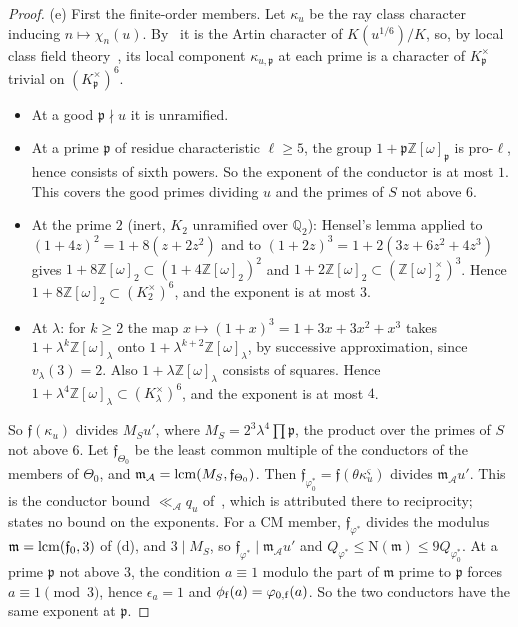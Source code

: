 \documentclass[11pt]{article}
\numberwithin{equation}{section}
\newcommand{\OO}{\mathbb Z[\omega]}
\newcommand{\N}{\mathrm N}
\begin{document}
\begin{proof}
(e) First the finite-order members. Let $\kappa_u$ be the ray class character inducing
$n\mapsto\chi_n(u)$. By~\cite[Lemma~4.1]{OAI78} it is the Artin character of
$K(u^{1/6})/K$, so, by local class field theory~\cite[Ch.~V]{Neukirch}, its local component $\kappa_{u,\mathfrak p}$ at each prime is a character of
$K_{\mathfrak p}^\times$ trivial on $(K_{\mathfrak p}^\times)^6$.
\begin{itemize}
\item At a good $\mathfrak p\nmid u$ it is unramified.
\item At a prime $\mathfrak p$ of residue characteristic $\ell\ge5$, the group
 $1+\mathfrak p\OO_{\mathfrak p}$ is pro-$\ell$, hence consists of sixth powers. So the exponent of the
 conductor is at most $1$. This covers the good primes dividing $u$ and the primes of $S$ not above $6$.
\item At the prime $2$ (inert, $K_2$ unramified over $\mathbb Q_2$): Hensel's lemma applied to
 $(1+4z)^2=1+8(z+2z^2)$ and to $(1+2z)^3=1+2(3z+6z^2+4z^3)$ gives
 $1+8\OO_2\subset(1+4\OO_2)^2$ and $1+2\OO_2\subset(\OO_2^\times)^3$. Hence
 $1+8\OO_2\subset(K_2^\times)^6$, and the exponent is at most $3$.
\item At $\lambda$: for $k\ge2$ the map $x\mapsto(1+x)^3=1+3x+3x^2+x^3$ takes $1+\lambda^k\OO_\lambda$
 onto $1+\lambda^{k+2}\OO_\lambda$, by successive approximation, since $v_\lambda(3)=2$. Also
 $1+\lambda\OO_\lambda$ consists of squares. Hence $1+\lambda^4\OO_\lambda\subset(K_\lambda^\times)^6$, and the
 exponent is at most $4$.
\end{itemize}
So $\mathfrak f(\kappa_u)$ divides $M_Su'$, where $M_S=2^3\lambda^4\prod\mathfrak p$, the product over
the primes of $S$ not above $6$. Let $\mathfrak f_{\Theta_0}$ be the least common multiple of the
conductors of the members of $\Theta_0$, and $\mathfrak m_{\mathcal A}={\rm lcm}(M_S,\mathfrak f_{\Theta_0})$.
Then $\mathfrak f_{\varphi_0^*}=\mathfrak f(\theta\kappa_u^\varsigma)$ divides $\mathfrak m_{\mathcal A}u'$. This is
the conductor bound $\ll_{\mathcal A}q_u$ of~\cite[Section~8.1]{OAI78}, which is attributed there to
reciprocity; \cite[Lemma~4.1]{OAI78} states no bound on the exponents. For a CM member, $\mathfrak f_{\varphi^*}$
divides the modulus $\mathfrak m={\rm lcm}(\mathfrak f_0,3)$ of (d), and $3\mid M_S$, so
$\mathfrak f_{\varphi^*}\mid\mathfrak m_{\mathcal A}u'$ and $Q_{\varphi^*}\le\N(\mathfrak m)\le9Q_{\varphi_0^*}$.
At a prime $\mathfrak p$ not above $3$, the condition $a\equiv1$ modulo the part of $\mathfrak m$ prime to
$\mathfrak p$ forces $a\equiv1\pmod3$, hence $\epsilon_a=1$ and $\phi_{\rm f}(a)=\varphi_{0,\rm f}(a)$. So the
two conductors have the same exponent at $\mathfrak p$.


\end{proof}
\end{document}
